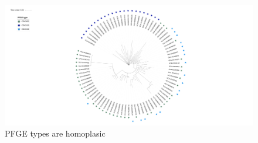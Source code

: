 \documentclass{article}
\begin{document}
\begin{figure}[h!]
\centering

\includegraphics[width=\textwidth{}]{PFGE_tree.png}
\caption{PFGE types are homoplasic}
\label{fig:PFGE_tree}
\end{figure}









%
%
\end{document}
